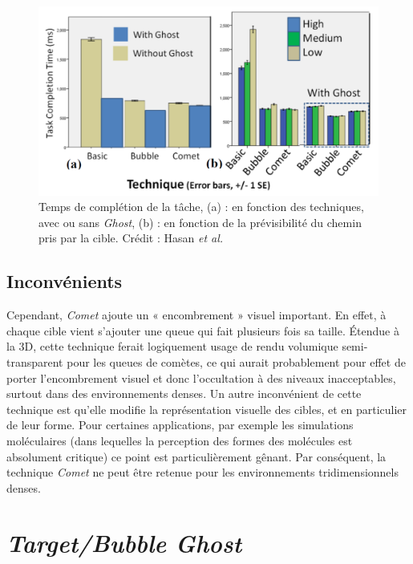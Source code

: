 	\begin{figure}[ht]
		\centering
		\includegraphics[width=\textwidth]{figures/cometGhostPredictability}
		\caption{Temps de complétion de la tâche, (a) : en fonction des techniques, avec ou sans \emph{Ghost}, (b) : en fonction de la prévisibilité du chemin pris par la cible. Crédit : Hasan \emph{et al.}}
		\label{fig:cometGhostPredictability}
	\end{figure}

	\subsection{Inconvénients}
	Cependant, \emph{Comet} ajoute un « encombrement » visuel important. En effet, à chaque cible vient s'ajouter une queue qui fait plusieurs fois sa taille. Étendue à la 3D, cette technique ferait logiquement usage de rendu volumique semi-transparent pour les queues de comètes, ce qui aurait probablement pour effet de porter l'encombrement visuel et donc l'occultation à des niveaux inacceptables, surtout dans des environnements denses. Un autre inconvénient de cette technique est qu'elle modifie la représentation visuelle des cibles, et en particulier de leur forme. Pour certaines applications, par exemple les simulations moléculaires (dans lequelles la perception des formes des molécules est absolument critique) ce point est particulièrement gênant. Par conséquent, la technique \emph{Comet} ne peut être retenue pour les environnements tridimensionnels denses.

\section{\emph{Target/Bubble Ghost}}
